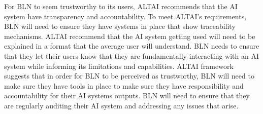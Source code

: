 \documentclass[a4paper,10pt]{article}
\begin{document}
	For BLN to seem trustworthy to its users, ALTAI recommends that the AI system have transparency and accountability. To meet ALTAI's requirements, BLN will need to ensure they have systems in place that show traceability mechanisms. ALTAI recommend that the AI system getting used will need to be explained in a format that the average user will understand. BLN needs to ensure that they let their users know that they are fundamentally interacting with an AI system while informing its limitations and capabilities. ALTAI framework suggests that in order for BLN to be perceived as trustworthy, BLN will need to make sure they have tools in place to make sure they have responsibility and accountability for their AI systems outputs. BLN will need to ensure that they are regularly auditing their AI system and addressing any issues that arise.  
	
\medskip
\newpage
	
	

\newpage



\end{document}
